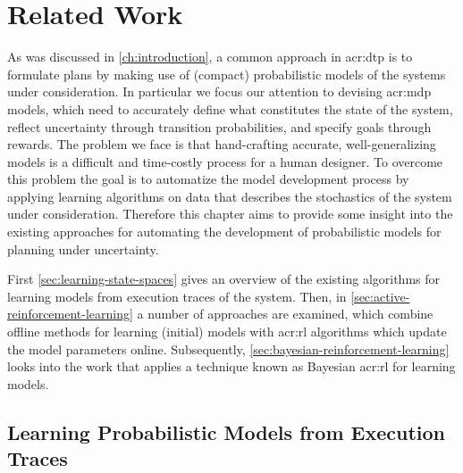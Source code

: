 \chapter{Related Work}
\label{ch:problem-related-work}

As was discussed in \autoref{ch:introduction}, a common approach in \acrshort{acr:dtp} is to formulate plans by making use of (compact) probabilistic models of the systems under consideration.
In particular we focus our attention to devising \acrshort{acr:mdp} models, which need to accurately define what constitutes the state of the system, reflect uncertainty through transition probabilities, and specify goals through rewards.
The problem we face is that hand-crafting accurate, well-generalizing models is a difficult and time-costly process for a human designer.
To overcome this problem the goal is to automatize the model development process by applying learning algorithms on data that describes the stochastics of the system under consideration.
Therefore this chapter aims to provide some insight into the existing approaches for automating the development of probabilistic models for planning under uncertainty.

First \autoref{sec:learning-state-spaces} gives an overview of the existing algorithms for learning models from execution traces of the system.
Then, in \autoref{sec:active-reinforcement-learning} a number of approaches are examined, which combine offline methods for learning (initial) models with \acrshort{acr:rl} algorithms which update the model parameters online.
Subsequently, \autoref{sec:bayesian-reinforcement-learning} looks into the work that applies a technique known as Bayesian \acrlong{acr:rl} for learning models.

%

\section{Learning Probabilistic Models from Execution Traces}
\label{sec:learning-state-spaces}

